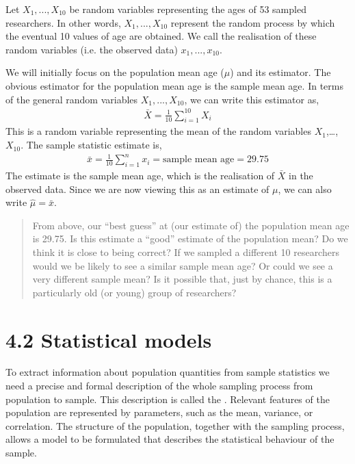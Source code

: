 \documentclass[letterpaper,10pt,english]{jupyterBook}
\begin{document}
\sphinxAtStartPar
Let \(X_1, ..., X_{10}\) be random variables representing the ages of 53 sampled researchers. In other words, \(X_1, ..., X_{10}\) represent the random process by which the eventual 10 values of age are obtained. We call the realisation of these random variables (i.e. the observed data) \(x_1, ..., x_{10}\).

\sphinxAtStartPar
We will initially focus on the population mean age (\(\mu\)) and its estimator. The obvious estimator for the population mean age is the sample mean age. In terms of the general random variables \(X_1, ..., X_{10}\), we can write this estimator as,
\begin{equation*}
\begin{split}
\bar{X} = \frac{1}{10} \sum_{i=1}^{10} X_i
\end{split}
\end{equation*}
\sphinxAtStartPar
This is a random variable representing the mean of the random variables \(X_1\),…,\(X_{10}\). The sample statistic estimate is,
\begin{equation*}
\begin{split}
\bar{x} = \frac{1}{10} \sum_{i=1}^n x_i = \mbox{sample mean age} = 29.75
\end{split}
\end{equation*}
\sphinxAtStartPar
The estimate is the sample mean age, which is the realisation of \(\bar{X}\) in the observed data. Since we are now viewing this as an estimate of \(\mu\), we can also write \(\hat{\mu} = \bar{x}\).
\begin{quote}

\sphinxAtStartPar
{}
 \sphinxhyphen{} From above, our “best guess” at (our estimate of) the population mean age is 29.75.
 \sphinxhyphen{} Is this estimate a “good” estimate of the population mean? Do we think it is close to being correct?
 \sphinxhyphen{} If we sampled a different 10 researchers would we be likely to see a similar sample mean age? Or could we see a very different sample mean? Is it possible that, just by chance, this is a particularly old (or young) group of researchers?
\end{quote}


\section{4.2 Statistical models}
\label{\detokenize{04.c. Population.and.samples:statistical-models}}\label{\detokenize{04.c. Population.and.samples::doc}}
\sphinxAtStartPar
To extract information about population quantities from sample statistics we need a precise and formal description of the whole sampling process from population to sample. This description is called the . Relevant features of the population are represented by parameters, such as the mean, variance, or correlation. The structure of the population, together with the sampling process, allows a model to be formulated that describes the statistical behaviour of the sample.
\end{document}
